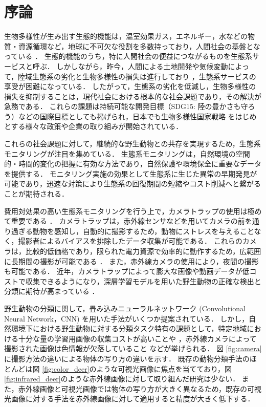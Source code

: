 \documentclass[a4paper,11pt,nomag]{jsreport}
\begin{document}
\chapter*{序論}

生物多様性が生み出す生態的機能は，温室効果ガス，エネルギー，水などの物質・資源循環など，地球に不可欠な役割を多数持っており，人間社会の基盤となっている \cite{millennium-ecosystem2005,cardinale2011}．
生態的機能のうち，特に人間社会の便益につながるものを生態系サービスと呼ぶ．
しかしながら，昨今，人間による土地開発や気候変動によって，陸域生態系の劣化と生物多様性の損失は進行しており \cite{newbold2015,isbell2017}，生態系サービスの享受が困難になっている．
したがって，生態系の劣化を低減し，生物多様性の損失を抑制することは，現代社会における根本的な社会課題であり，その解決が急務である．
これらの課題は持続可能な開発目標（SDG15: 陸の豊かさも守ろう）などの国際目標としても掲げられ，日本でも生物多様性国家戦略 \cite{biodiversity2023}をはじめとする様々な政策や企業の取り組みが開始されている．

これらの社会課題に対して，継続的な野生動物との共存を実現するため，生態系モニタリングが注目を集めている．
生態系モニタリングは，自然環境の空間的・時間的変化の把握に有効な方法であり，自然保護や環境保全に重要なデータを提供する．
モニタリング実施の効果として生態系に生じた異常の早期発見が可能であり，迅速な対策により生態系の回復期間の短縮やコスト削減へと繋がることが期待される．

費用対効果の高い生態系モニタリングを行う上で，カメラトラップの使用は極めて重要である \cite{jia2022}．
カメラトラップは，赤外線センサなどを用いてカメラの前を通り過ぎる動物を感知し，自動的に撮影するため，動物にストレスを与えることなく，撮影者によるバイアスを排除したデータ収集が可能である\cite{newey2015,zhu2017}．
これらのカメラは，比較的低価格であり，限られた電力資源で効率的に動作するため，広範囲に長期間の撮影が可能である \cite{schneider2018, carl2020}．
また，赤外線カメラの使用により，夜間の撮影も可能である．
近年，カメラトラップによって膨大な画像や動画データが低コストで収集できるようになり，深層学習モデルを用いた野生動物の正確な検出と分類に期待が高まっている \cite{tan2022}．

野生動物の分類に関して，畳み込みニューラルネットワーク (Convolutional Neural Network，CNN) を用いた手法がいくつか提案されている．
しかし，自然環境下における野生動物に対する分類タスク特有の課題として，特定地域における十分な量の学習用画像の収集コストが高いことや \cite{schneider2020}，赤外線カメラによって撮影された画像は色情報が欠落していること \cite{kishimoto2023}などが挙げられる．
図 \ref{fig:camera}に撮影方法の違いによる物体の写り方の違いを示す．
既存の動物分類手法のほとんどは図 \ref{fig:color_deer}のような可視光画像に焦点を当てており，図\ref{fig:infrared_deer}のような赤外線画像に対して取り組んだ研究は少ない．
また，赤外線画像と可視光画像では物体の写り方が大きく異なるため，既存の可視光画像に対する手法を赤外線画像に対して適用すると精度が大きく低下する．
\end{document}
